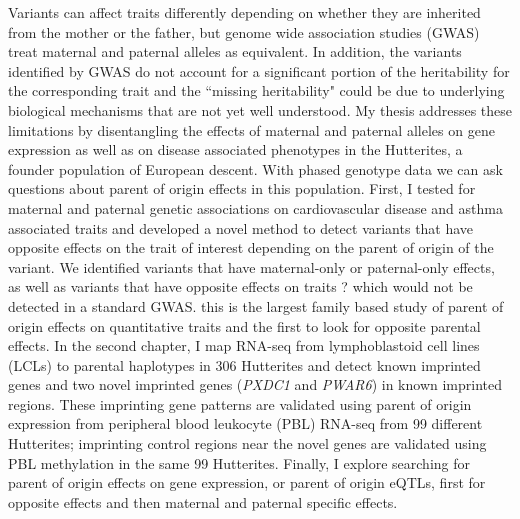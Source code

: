 \abstract

Variants can affect traits differently depending on whether they are inherited from the mother or the father, but genome wide association studies (GWAS) treat maternal and paternal alleles as equivalent. In addition, the variants identified by GWAS do not account for a significant portion of the heritability for the corresponding trait and the ``missing heritability" could be due to underlying biological mechanisms that are not yet well understood. My thesis addresses these limitations by disentangling the effects of maternal and paternal alleles on gene expression as well as on disease associated phenotypes in the Hutterites, a founder population of European descent. With phased genotype data we can ask questions about parent of origin effects in this population. First, I tested for maternal and paternal genetic associations on cardiovascular disease and asthma associated traits and developed a novel method to detect variants that have opposite effects on the trait of interest depending on the parent of origin of the variant. We identified variants that have maternal-only or paternal-only effects, as well as variants that have opposite effects on traits ? which would not be detected in a standard GWAS. this is the largest family based study of parent of origin effects on quantitative traits and the first to look for opposite parental effects. In the second chapter, I map RNA-seq from lymphoblastoid cell lines (LCLs) to parental haplotypes in 306  Hutterites and detect known imprinted genes and two novel imprinted genes (\emph{PXDC1} and \emph{PWAR6}) in known imprinted regions. These imprinting gene patterns are validated using parent of origin expression from peripheral blood leukocyte (PBL) RNA-seq from 99 different Hutterites; imprinting control regions near the novel genes are validated using PBL methylation in the same 99 Hutterites. Finally, I explore searching for parent of origin effects on gene expression, or parent of origin eQTLs, first for opposite effects and then maternal and paternal specific effects. 